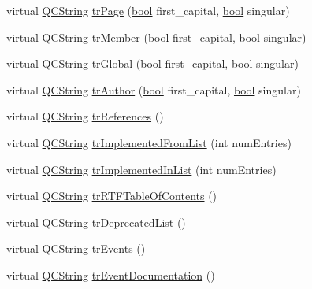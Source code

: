 \begin{DoxyCompactItemize}
\item 
virtual \hyperlink{class_q_c_string}{Q\+C\+String} \hyperlink{class_translator_czech_a99ddd126be16149eed47e3c607bb620c}{tr\+Page} (\hyperlink{qglobal_8h_a1062901a7428fdd9c7f180f5e01ea056}{bool} first\+\_\+capital, \hyperlink{qglobal_8h_a1062901a7428fdd9c7f180f5e01ea056}{bool} singular)
\item 
virtual \hyperlink{class_q_c_string}{Q\+C\+String} \hyperlink{class_translator_czech_a2d61740da3fefe1d80fe78835555bce5}{tr\+Member} (\hyperlink{qglobal_8h_a1062901a7428fdd9c7f180f5e01ea056}{bool} first\+\_\+capital, \hyperlink{qglobal_8h_a1062901a7428fdd9c7f180f5e01ea056}{bool} singular)
\item 
virtual \hyperlink{class_q_c_string}{Q\+C\+String} \hyperlink{class_translator_czech_a698757d212a12df7f650c4dc82df12e1}{tr\+Global} (\hyperlink{qglobal_8h_a1062901a7428fdd9c7f180f5e01ea056}{bool} first\+\_\+capital, \hyperlink{qglobal_8h_a1062901a7428fdd9c7f180f5e01ea056}{bool} singular)
\item 
virtual \hyperlink{class_q_c_string}{Q\+C\+String} \hyperlink{class_translator_czech_adef3362cee69f543048b0e08b400fcad}{tr\+Author} (\hyperlink{qglobal_8h_a1062901a7428fdd9c7f180f5e01ea056}{bool} first\+\_\+capital, \hyperlink{qglobal_8h_a1062901a7428fdd9c7f180f5e01ea056}{bool} singular)
\item 
virtual \hyperlink{class_q_c_string}{Q\+C\+String} \hyperlink{class_translator_czech_a35abf3f6fe6ad59907dc7bc5265e872f}{tr\+References} ()
\item 
virtual \hyperlink{class_q_c_string}{Q\+C\+String} \hyperlink{class_translator_czech_a70f7c22ba1a47b14f1c7babd702475a6}{tr\+Implemented\+From\+List} (int num\+Entries)
\item 
virtual \hyperlink{class_q_c_string}{Q\+C\+String} \hyperlink{class_translator_czech_aebab1abf725031307c6182dfd88bd15f}{tr\+Implemented\+In\+List} (int num\+Entries)
\item 
virtual \hyperlink{class_q_c_string}{Q\+C\+String} \hyperlink{class_translator_czech_a122ec8d634b0e4dd579752b446862208}{tr\+R\+T\+F\+Table\+Of\+Contents} ()
\item 
virtual \hyperlink{class_q_c_string}{Q\+C\+String} \hyperlink{class_translator_czech_ab6babc7cf43e4be0634f83f513200550}{tr\+Deprecated\+List} ()
\item 
virtual \hyperlink{class_q_c_string}{Q\+C\+String} \hyperlink{class_translator_czech_a5411d69f698ce42fcca7d5ed3e9ae7ab}{tr\+Events} ()
\item 
virtual \hyperlink{class_q_c_string}{Q\+C\+String} \hyperlink{class_translator_czech_a0644f7776c80bce90143f808f6299b7b}{tr\+Event\+Documentation} ()

\end{DoxyCompactItemize}
